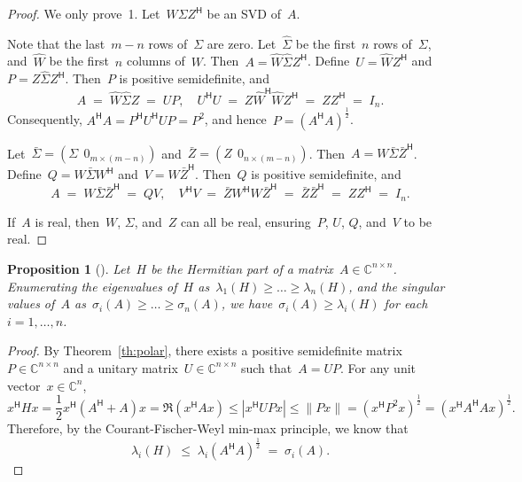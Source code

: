 \documentclass[11pt,a4paper]{article}  %
\numberwithin{equation}{section}
\newtheorem{proposition}{Proposition}%
\theoremstyle{definition}
\def\CC{\mathbb{C}}
\newcommand{\hmt}{{\scriptscriptstyle{{\mathsf{H}}}}}
\begin{document}
\begin{proof}
  We only prove~1.
  Let~$ W\Sigma Z^\hmt$ be an SVD of~$A$.

  Note that the last~$m-n$ rows of~$\Sigma$ are zero.
  Let~$\hat{\Sigma}$ be the first~$n$ rows of~$\Sigma$, and~$\hat{W}$ be the first~$n$ columns
  of~$W$. Then~$A = \hat{W}\hat{\Sigma}Z^\hmt $. Define~$U = \hat{W}Z^\hmt$ and~$P
  = Z\hat{\Sigma} Z^\hmt$. Then~$P$ is positive semidefinite, and
  \begin{equation*}
    A \;=\; \hat{W}\hat{\Sigma} Z\;=\; UP,\quad
    U^\hmt U \;=\; Z\hat{W}^\hmt \hat{W} Z^\hmt \;=\;ZZ^\hmt \;=\; I_n.
  \end{equation*}
  Consequently, $A^\hmt A  =  P^\hmt U^\hmt U P = P^2$, and hence~$P = (A^\hmt
  A)^{\frac{1}{2}}$.

  Let~$\bar{\Sigma} = (\Sigma\;\, 0_{m\times(m-n)})$ and~$\bar{Z} = (Z\;\,0_{n\times (m-n)})$.
  Then~$A = W\bar{\Sigma} \bar{Z}^\hmt$. Define~$Q = W\bar{\Sigma} W^\hmt$ and~$V = W\bar{Z}^\hmt$.
  Then~$Q$ is positive semidefinite, and
  \begin{equation*}
    A\;=\; W\bar{\Sigma}\bar{Z}^\hmt \;=\; QV, \quad
    V^\hmt V \;=\; \bar{Z}W^\hmt W \bar{Z}^\hmt \;=\; \bar{Z}\bar{Z}^\hmt \;=\; ZZ^\hmt \;=\; I_n.
  \end{equation*}

  If~$A$ is real, then~$W$, $\Sigma$, and~$Z$ can all be real,
  ensuring~$P$, $U$, $Q$, and~$V$ to be real.
\end{proof}

\begin{proposition}[\cite{Fan_Hoffman_1955}]
  Let~$H$ be the Hermitian part of a matrix~$A \in \CC^{n\times n}$. Enumerating the eigenvalues
  of~$H$ as~$\lambda_1(H) \ge\dots\ge \lambda_n(H)$, and the singular values of~$A$
  as~$\sigma_i(A) \ge\dots\ge \sigma_n(A)$, we have~$\sigma_{i}(A)\ge
  \lambda_i(H)$ for each~$i = 1, \dots, n$.
\end{proposition}

\begin{proof}
  By Theorem~\ref{th:polar}, there exists a positive semidefinite matrix~$P\in \CC^{n\times n}$ and
  a unitary matrix~$U\in \CC^{n\times n}$ such that~$A = UP$. For any unit vector~$x\in \CC^n$,
  \begin{equation*}
    x^\hmt H x = \frac{1}{2}x^\hmt (A^\hmt + A)x = \Re(x^\hmt A x) \le %
    |x^\hmt U P x|\le \|Px\| = (x^\hmt P^2 x)^{\frac{1}{2}} =(x^\hmt A^\hmt A x)^{\frac{1}{2}}.
  \end{equation*}
  Therefore, by the Courant-Fischer-Weyl min-max principle, we know that
  \begin{equation*}
    \lambda_i(H) \;\le\; \lambda_i(A^\hmt A)^{\frac{1}{2}}\;=\; \sigma_i(A).
  \end{equation*}
\end{proof}
\end{document}
